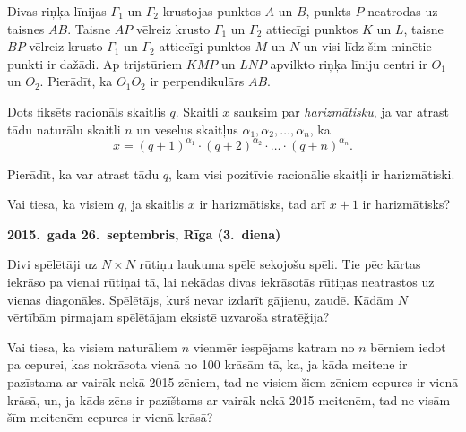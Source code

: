 \documentclass[11pt]{article}
\newcounter{alphnum}
\newenvironment{alphlist}{\begin{list}{(\Alph{alphnum})}{\usecounter{alphnum}\setlength{\leftmargin}{2.5em}} \rm}{\end{list}}
\begin{document}
\begin{problem}[BW.TST.2015.7]
Divas riņķa līnijas $\Gamma_1$ un $\Gamma_2$ krustojas punktos $A$ un $B$, punkts $P$ neatrodas uz taisnes $AB$. 
Taisne $AP$ vēlreiz krusto $\Gamma_1$ un $\Gamma_2$ attiecīgi punktos $K$ un $L$, taisne $BP$ vēlreiz krusto 
$\Gamma_1$ un $\Gamma_2$ attiecīgi punktos $M$ un $N$ un visi līdz šim minētie punkti ir dažādi. 
Ap trijstūriem $KMP$ un $LNP$ apvilkto riņķa līniju 
centri ir $O_1$ un $O_2$. Pierādīt, ka $O_1O_2$ ir perpendikulārs $AB$. 
\end{problem}

\begin{problem}[BW.TST.2015.8]
Dots fiksēts racionāls skaitlis $q$. Skaitli $x$ sauksim par {\em harizmātisku}, ja var atrast tādu naturālu 
skaitli $n$ un veselus skaitļus $\alpha_1, \alpha_2, \ldots, \alpha_n$, ka 
\[ x = (q + 1)^{\alpha_1} \cdot (q+2)^{\alpha_2} \cdot \ldots \cdot (q + n)^{\alpha_n}. \]
\begin{alphlist}
\item Pierādīt, ka var atrast tādu $q$, kam visi pozitīvie racionālie skaitļi ir harizmātiski. 
\item Vai tiesa, ka visiem $q$, ja skaitlis $x$ ir harizmātisks, tad arī $x + 1$ ir harizmātisks?
\end{alphlist}
\end{problem}


\begin{center}
{\bf 2015.\ gada 26.\ septembris, Rīga (3.\ diena)}
\end{center}

\begin{problem}[BW.TST.2015.9]
Divi spēlētāji uz $N \times N$ rūtiņu laukuma spēlē sekojošu spēli. Tie pēc kārtas iekrāso pa vienai rūtiņai tā, 
lai nekādas divas iekrāsotās rūtiņas neatrastos uz vienas diagonāles. Spēlētājs, kurš nevar izdarīt
gājienu, zaudē. Kādām $N$ vērtībām pirmajam spēlētājam eksistē uzvaroša stratē\v{g}ija?
\end{problem}


\begin{problem}[BW.TST.2015.10]
Vai tiesa, ka visiem naturāliem $n$ vienmēr iespējams katram no $n$ bērniem iedot pa cepurei, kas 
nokrāsota vienā no 100 krāsām tā, ka, ja kāda meitene ir pazīstama ar vairāk nekā 2015 zēniem, tad 
ne visiem šiem zēniem cepures ir vienā krāsā, un, ja kāds zēns ir pazīštams ar vairāk nekā 2015 meitenēm, 
tad ne visām šīm meitenēm cepures ir vienā krāsā?
\end{problem}
\end{document}
